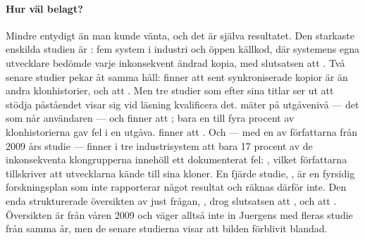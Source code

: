 \paragraph{Hur väl belagt?}  Mindre entydigt än man kunde vänta, och
det är själva resultatet.  Den starkaste enskilda studien är
\textcite[avsn.~9]{Juergens2009Clones}: fem system i industri och öppen källkod,
där systemens egna utvecklare bedömde varje inkonsekvent ändrad kopia,
med slutsatsen att .
Två senare studier pekar åt samma håll: \textcite{Barbour2011Clones}
finner att sent synkroniserade kopior är
 än
andra klonhistorier, och \textcite{Islam2017Clones} att
.  Men tre studier som efter sina titlar ser ut att
stödja påståendet visar sig vid läsning kvalificera det.
\textcite{Bettenburg2010Clones} mäter på utgåvenivå --- det som når
användaren --- och finner att ; bara en till fyra procent av klonhistorierna gav fel i
en utgåva.  \textcite[avsn.~VII]{Selim2010Clones} finner att
.  Och
\textcite[avsn.~VIII.A]{Wagner2016Clones} --- med en av författarna från 2009 års
studie --- finner i tre industrisystem att bara 17 procent av de
inkonsekventa klongrupperna innehöll ett dokumenterat fel:
, vilket
författarna tillskriver att utvecklarna kände till sina kloner.  En
fjärde studie, \textcite{Mondal2011Clones}, är en fyrsidig
forskningsplan som inte rapporterar något resultat och räknas därför
inte.  Den enda strukturerade översikten av just frågan,
\textcite[avsn.~4]{Hordijk2009Review}, drog slutsatsen att
, och att .
Översikten är från våren 2009 och väger alltså inte in Juergens med
fleras studie från samma år, men de senare studierna visar att bilden
förblivit blandad.


